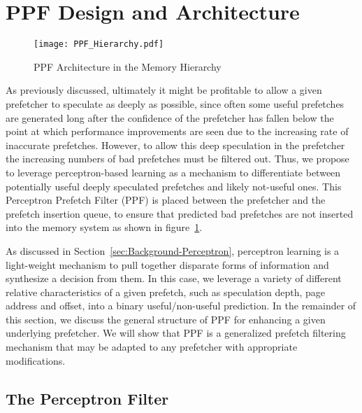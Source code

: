 \section{PPF Design and Architecture}
\label{Arch}

\begin{figure}
  \begin{center}
  \texttt{[image: PPF\_Hierarchy.pdf]}
    \label{fig:PPF_Hierarchy}
  \caption{PPF Architecture in the Memory Hierarchy}
  \end{center}
\end{figure}

As previously discussed, ultimately it might be profitable to allow a given
prefetcher to speculate as deeply as possible, since often some useful
prefetches are generated long after the confidence of the prefetcher has
fallen below the point at which performance improvements are seen due to the
increasing rate of inaccurate prefetches.  However, to allow this deep
speculation in the prefetcher the increasing numbers of bad prefetches must be
filtered out.  Thus, we propose to leverage perceptron-based learning as a
mechanism to differentiate between potentially useful deeply speculated
prefetches and likely not-useful ones.  This Perceptron Prefetch Filter (PPF)
is placed between the prefetcher and the prefetch insertion queue, to ensure
that predicted bad prefetches are not inserted into the memory system as shown in 
figure~\ref{fig:PPF_Hierarchy}.

As discussed in Section~\ref{sec:Background-Perceptron}, perceptron learning
is a light-weight mechanism to pull together disparate forms of information
and synthesize a decision from them.  In this case, we leverage a variety of
different relative characteristics of a given prefetch, such as speculation
depth, page address and offset, into a binary useful/non-useful prediction.
In the remainder of this section, we discuss the general structure of PPF
for enhancing a given underlying prefetcher.  We will show that PPF is a
generalized prefetch filtering mechanism that may be adapted to any prefetcher
with appropriate modifications.

\subsection{The Perceptron Filter}
\label{Arch-Perceptron}


